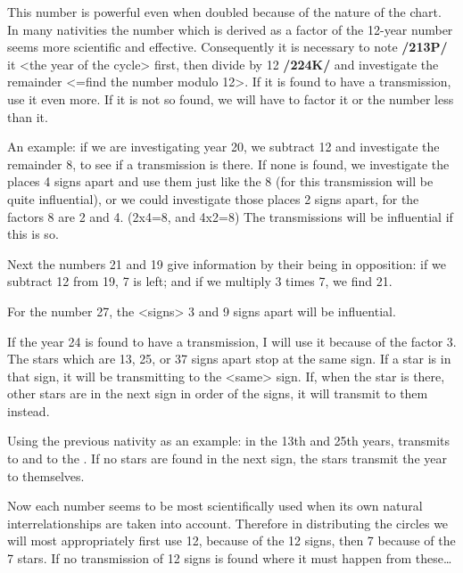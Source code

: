 This number is powerful even when doubled because of the nature of the chart. In many nativities the number which is derived as a factor of the 12-year number seems more scientific and effective. Consequently it is necessary to note \textbf{/213P/} it <the year of the cycle> first, then divide by 12 \textbf{/224K/} and investigate the remainder <=find the number modulo 12>. If it is found to have a transmission, use it even more. If it is not so found, we will have to factor it or the number less than it. 

An example: if we are investigating year 20, we subtract 12 and investigate the remainder 8, to see if a transmission is there. If
none is found, we investigate the places 4 signs apart and use them just like the 8 (for this transmission will be quite influential), or we could investigate those places 2 signs apart, for the factors 8 are 2 and 4. (2x4=8, and 4x2=8) The transmissions will be influential if this is so.

Next the numbers 21 and 19 give information by their being in opposition: if we subtract 12 from 19, 7 is left; and if we multiply 3 times 7, we find 21. 

For the number 27, the <signs> 3 and 9 signs apart will be influential. 

If the year 24 is found to have a transmission, I will use it because of the factor 3. The stars which are 13, 25, or 37 signs apart stop at the same sign. If a star is in that sign, it will be transmitting to the <same> sign. If, when the star is there, other stars are in the next sign in order of the signs, it will transmit to them instead. 

Using the previous nativity as an example: in the 13th and 25th
years, \Mars\xspace transmits to \Jupiter\xspace and \Jupiter\xspace to the \Moon. If no stars are found in the next sign, the stars
transmit the year to themselves. 

Now each number seems to be most scientifically used when its own natural interrelationships are taken into account. Therefore in distributing the circles we will most appropriately first use 12, because of the 12 signs, then 7 because of the 7 stars. If no transmission of 12 signs is found where it must happen from these…

